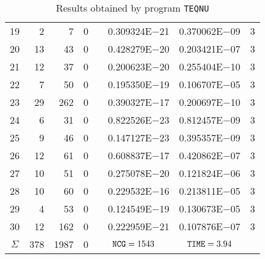 \documentclass{esub2acm}
\begin{document}
\begin{table}
\begin{tabular}{c|rrrr@{}lcc}
19  &   2   &   7   &   0   &       &   0.309324E$-$21  &   0.370062E$-$09  &   3   \\
20  &   13  &   43  &   0   &       &   0.428279E$-$20  &   0.203421E$-$07  &   3   \\
21  &   12  &   37  &   0   &       &   0.200623E$-$20  &   0.255404E$-$10  &   3   \\
22  &   7   &   50  &   0   &       &   0.195350E$-$19  &   0.106707E$-$05  &   3   \\
23  &   29  &   262 &   0   &       &   0.390327E$-$17  &   0.200697E$-$10  &   3   \\
24  &   6   &   31  &   0   &       &   0.822526E$-$23  &   0.812457E$-$09  &   3   \\
25  &   9   &   46  &   0   &       &   0.147127E$-$23  &   0.395357E$-$09  &   3   \\
26  &   12  &   61  &   0   &       &   0.608837E$-$17  &   0.420862E$-$07  &   3   \\
27  &   10  &   51  &   0   &       &   0.275078E$-$20  &   0.121824E$-$06  &   3   \\
28  &   10  &   60  &   0   &       &   0.229532E$-$16  &   0.213811E$-$05  &   3   \\
29  &   4   &   53  &   0   &       &   0.124549E$-$19  &   0.130673E$-$05  &   3   \\
30  &   12  &   162 &   0   &       &   0.222959E$-$21  &   0.107876E$-$07  &   3   \\ \hline
$\Sigma$\rule[-2pt]{0pt}{12pt}  &  378 &   1987  &   0  & \multicolumn{2}{c}{${\tt NCG} = 1543$} & ${\tt TIME} = 3.94$ &  \\ \hline
\end{tabular}
\caption{Results obtained by program {\tt TEQNU}}
\label{teqnu}
\end{table}

\clearpage
\end{document}
